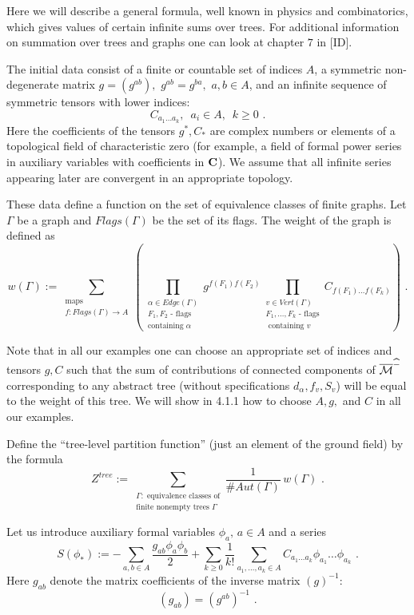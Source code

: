 \documentclass{amsart}
\begin{document}
Here we will describe a general formula, well known in physics and
combinatorics, which gives values of certain infinite sums over trees. For
additional information on summation over trees and graphs one can look at
chapter $7$ in [ID].

The initial data consist of a finite or countable set of indices $ A$, a
symmetric non-degenerate matrix $g=(g^{ab}),\,\,g^{ab}=g^{ba},\,\,a,b\in A$,
 and an infinite sequence of symmetric tensors with lower indices:
$$C_{a_1\dots a_k},\,\,\,a_i\in A,\,\,\,k\ge 0\,\,.$$
  Here the coefficients of the tensors $g^*,C_*$ are complex numbers or
elements of a topological field of characteristic zero (for example, a field of
formal power series in auxiliary variables with coefficients in $\mathbf C$). We
assume that all infinite series  appearing  later are convergent in an
appropriate topology.

These data define a function on the set of equivalence classes of finite
graphs.
 Let $\Gamma$ be a graph and $Flags(\Gamma)$ be the set of its flags. The
weight of the graph is defined as
$$w(\Gamma):=\sum_{\substack{\text{maps }\\f:Flags(\Gamma)\to A}}
\left(
\prod_{\substack{
\alpha\in Edge(\Gamma)\\
F_1,F_2\text{ - flags}\\\text{containing }\alpha
}}
g^{f(F_1)f(F_2)}
\prod_{\substack{
v\in Vert(\Gamma)\\F_1,\dots,F_k\text{ - flags}\\\text{ containing }v
}}
C_{f(F_1)\dots f(F_k)}\right)\,\,.$$

Note that in all our examples one can choose an appropriate set of indices and
tensors $g,C$ such that the sum of contributions of connected components
 of $\overline{\mathcal{M}}^{\widehat{\mathcal \Gamma}}$ corresponding to any abstract tree (without
specifications $d_{\alpha},f_v, S_v$) will be equal to the weight
 of this tree. We will show in 4.1.1 how to choose $A,g,$ and $C$
in all our examples.



Define  the ``tree-level partition function'' (just an element of the ground
field) by the formula
$$Z^{tree}:=\sum_{\substack{
\Gamma:\text{ equivalence classes of}
\\ \text{finite nonempty trees }\Gamma
}} \frac{1}{\# Aut(\Gamma)}\,w(\Gamma)\,\,.$$

Let us introduce auxiliary formal variables $\phi_a, \,a\in A$ and a series
$$S(\phi_*):=-\sum_{a,b\in A} \frac{g_{ab}\phi_a\phi_b}{2}
+\sum_{k\ge 0}\frac{1}{k!}\sum_{a_1,\dots,a_k\in A}C_{a_1\dots a_k}
\phi_{a_1}\dots\phi_{a_k}\,\,.$$
Here $g_{ab}$ denote the matrix coefficients of the inverse matrix
$(g)^{-1}$:
$$(g_{ab})=(g^{ab})^{-1}\,\,.$$
\end{document}
